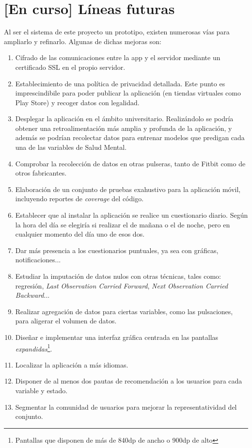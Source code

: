 \chapter{[En curso] Líneas futuras}
\label{chapter:lineas}



Al ser el sistema de este proyecto un prototipo, existen numerosas vías para ampliarlo y refinarlo. Algunas de dichas
mejoras son:

\begin{enumerate}
    \item Cifrado de las comunicaciones entre la app y el servidor mediante un certificado SSL en el propio servidor.
    \item Establecimiento de una política de privacidad detallada. Este punto es imprescindibile para poder publicar la aplicación (en tiendas virtuales como Play Store) y recoger datos con legalidad.
    \item Desplegar la aplicación en el ámbito universitario. Realizándolo se podría obtener una retroalimentación más
    amplia y profunda de la aplicación, y además se podrían recolectar datos para entrenar
    modelos que predigan cada una de las variables de Salud Mental.
    \item Comprobar la recolección de datos en otras pulseras, tanto de Fitbit como de otros fabricantes.
    \item Elaboración de un conjunto de pruebas exahustivo para la aplicación móvil, incluyendo reportes de 
    \textit{coverage} del código.
    \item Establecer que al instalar la aplicación se realice un cuestionario diario. Según la hora del día se elegiría
    si realizar el de mañana o el de noche, pero en cualquier momento del día uno de esos dos.
    \item Dar más presencia a los cuestionarios puntuales, ya sea con gráficas, notificaciones...
    \item Estudiar la imputación de datos nulos con otras técnicas, tales como: regresión, \textit{Last Observation 
    Carried Forward}, \textit{Next Observation Carried Backward}... \cite{gupta_null_nodate}
    \item Realizar agregación de datos para ciertas variables, como las pulsaciones, para aligerar el volumen de datos.
    \item Diseñar e implementar una interfaz gráfica centrada en las pantallas \textit{expandidas}\footnote{Pantallas 
    que disponen de más de 840dp de ancho o 900dp de alto}.
    \item Localizar la aplicación a más idiomas.
    \item Disponer de al menos dos pautas de recomendación a los usuarios para cada variable y estado.
    \item Segmentar la comunidad de usuarios para mejorar la representatividad del conjunto.
\end{enumerate}

